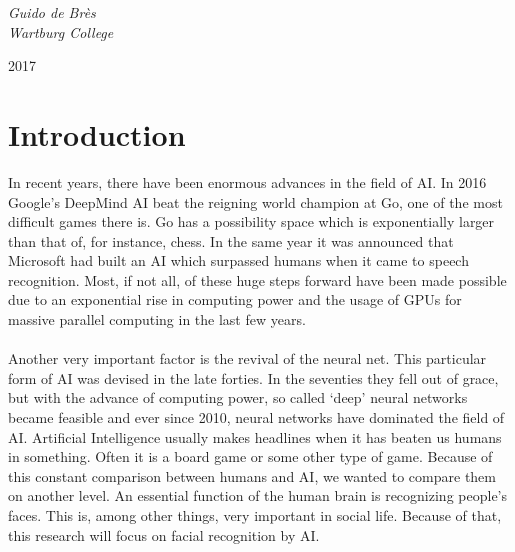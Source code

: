 \documentclass[12pt, titlepage]{article}
\let\oldsection\section
\renewcommand\section{\clearpage\oldsection}
\begin{document}
\begin{titlepage}
		\vspace{0.5\baselineskip} %
		
		\textit{Guido de Brès \\ Wartburg College} %
		
		\vfill %
		
		
		\vspace{0.3\baselineskip} %
		
		2017 %
		
	\end{titlepage}
	\tableofcontents
	
	\section{Introduction}
	In recent years, there have been enormous advances in the field of AI. In 2016 Google's DeepMind AI beat the reigning world champion at Go, one of the most difficult games there is\cite{byford16}. Go has a possibility space which is exponentially larger than that of, for instance, chess. In the same year it was announced that Microsoft had built an AI which surpassed humans when it came to speech recognition.
	Most, if not all, of these huge steps forward have been made possible due to an exponential rise in computing power and the usage of GPUs for massive parallel computing in the last few years.
	\\
	\\
	Another very important factor is the revival of the neural net. This particular form of AI was devised in the late forties. In the seventies they fell out of grace, but with the advance of computing power, so called ‘deep’ neural networks became feasible and ever since 2010, neural networks have dominated the field of AI.\cite{kuzovkin16}\cite{foote17} Artificial Intelligence usually makes headlines when it has beaten us humans in something. Often it is a board game or some other type of game. Because of this constant comparison between humans and AI, we wanted to compare them on another level. An essential function of the human brain is recognizing people's faces. This is, among other things, very important in social life. Because of that, this research will focus on facial recognition by AI.
	
\end{document}
